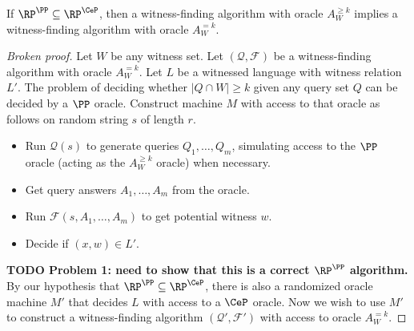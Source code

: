 \documentclass{article}
\newcommand{\todo}[1]{\textbf{TODO #1}}
\newcommand{\mc}{\mathcal}
\begin{document}
\begin{conjecture}
  If $\RP^\PP \subseteq \RP^{\CeP}$, then a witness-finding algorithm with oracle $A^{\geq k}_W$ implies a witness-finding algorithm with oracle $A^{= k}_W$.
\end{conjecture}
\begin{proof}[Broken proof]
  Let $W$ be any witness set.
  Let $(\mc{Q}, \mc{F})$ be a witness-finding algorithm with oracle $A^{= k}_W$.
  Let $L$ be a witnessed language with witness relation $L'$.
  The problem of deciding whether $|Q \cap W| \geq k$ given any query set $Q$ can be decided by a $\PP$ oracle.
  Construct machine $M$ with access to that oracle as follows on random string $s$ of length $r$.
  \begin{itemize}
  \item Run $\mc{Q}(s)$ to generate queries $Q_1, \dotsc, Q_m$, simulating access to the $\PP$ oracle (acting as the $A^{\geq k}_W$ oracle) when necessary.
  \item Get query answers $A_1, \dotsc, A_m$ from the oracle.
  \item Run $\mc{F}(s, A_1, \dotsc, A_m)$ to get potential witness $w$.
  \item Decide if $(x, w) \in L'$.
  \end{itemize}
  \todo{Problem 1: need to show that this is a correct $\RP^\PP$ algorithm.}
  By our hypothesis that $\RP^\PP \subseteq \RP^{\CeP}$, there is also a randomized oracle machine $M'$ that decides $L$ with access to a $\CeP$ oracle.
  Now we wish to use $M'$ to construct a witness-finding algorithm $(\mc{Q}', \mc{F}')$ with access to oracle $A^{= k}_W$.


\end{proof}
\end{document}
